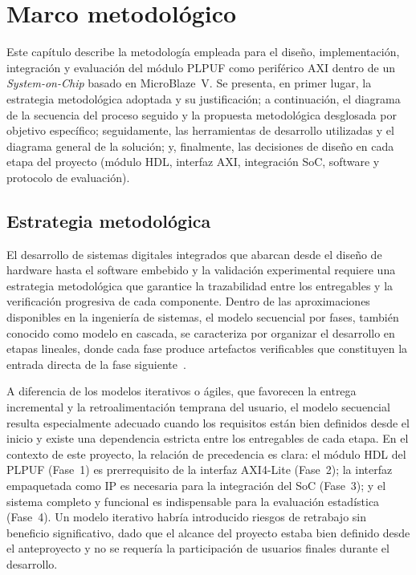 
\chapter{Marco metodológico}
\label{ch:solucion}

Este capítulo describe la metodología empleada para el diseño,
implementación, integración y evaluación del módulo PLPUF como
periférico AXI dentro de un \textit{System-on-Chip} basado en MicroBlaze~V.
Se presenta, en primer lugar, la estrategia metodológica adoptada y su
justificación; a continuación, el diagrama de la secuencia del proceso
seguido y la propuesta metodológica desglosada por objetivo específico;
seguidamente, las herramientas de desarrollo utilizadas y el diagrama
general de la solución; y, finalmente, las decisiones de diseño en cada
etapa del proyecto (módulo HDL, interfaz AXI, integración SoC, software
y protocolo de evaluación).

\section{Estrategia metodológica}
\label{sec:estrategia}

El desarrollo de sistemas digitales integrados que abarcan desde el
diseño de hardware hasta el software embebido y la validación experimental
requiere una estrategia metodológica que garantice la trazabilidad entre
los entregables y la verificación progresiva de cada componente. Dentro
de las aproximaciones disponibles en la ingeniería de sistemas, el modelo
secuencial por fases, también conocido como modelo en cascada, se
caracteriza por organizar el desarrollo en etapas lineales, donde cada
fase produce artefactos verificables que constituyen la entrada directa
de la fase siguiente~\cite{ug994}.

A diferencia de los modelos iterativos o ágiles, que favorecen la
entrega incremental y la retroalimentación temprana del usuario, el
modelo secuencial resulta especialmente adecuado cuando los requisitos
están bien definidos desde el inicio y existe una dependencia estricta
entre los entregables de cada etapa. En el contexto de este proyecto,
la relación de precedencia es clara: el módulo HDL del PLPUF (Fase~1)
es prerrequisito de la interfaz AXI4-Lite (Fase~2); la interfaz
empaquetada como IP es necesaria para la integración del SoC (Fase~3);
y el sistema completo y funcional es indispensable para la evaluación
estadística (Fase~4). Un modelo iterativo habría introducido riesgos de
retrabajo sin beneficio significativo, dado que el alcance del proyecto
estaba bien definido desde el anteproyecto y no se requería la
participación de usuarios finales durante el desarrollo.

